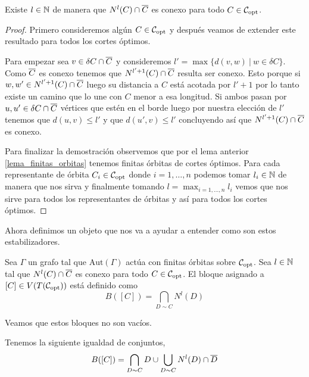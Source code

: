 \documentclass[tesis.tex]{subfiles}
\newcommand{\aut}{\text{Aut}}
\begin{document}
\begin{lema}\label{lema_nlC_cap_olC_conexo}
	Existe $l \in \mathbb{N}$ de manera que $N^l(C) \cap \overline C$ es conexo para todo $C \in {\cal C}_{\text{opt}}$.
\end{lema}
\begin{proof}
	Primero consideremos algún $C \in {\cal C}_{\text{opt}}$ y después veamos de extender este resultado para todos los cortes óptimos.
	
	Para empezar sea $v \in \delta C \cap \overline C$ y consideremos $l' = \max  \{d(v,w) \ | \ w \in \delta C\}$.
	Como $\overline C$ es conexo tenemos que $N^{l'+1}(C) \cap \overline C$ resulta ser conexo.
	Esto porque si $w,w' \in N^{l'+1}(C) \cap \overline C$ luego su distancia a $C$ está acotada por $l'+1$ por lo tanto existe un camino que lo une con $C$ menor a esa longitud.
	Si ambos pasan por $u,u' \in \delta C \cap \overline C$ vértices que estén en el borde luego por nuestra elección de $l'$ tenemos que $d(u,v) \le l'$ y que $d(u',v) \le l'$ concluyendo así que $N^{l'+1}(C) \cap \overline C$ es conexo.
	
	Para finalizar la demostración observemos que por el lema anterior \ref{lema_finitas_orbitas} tenemos finitas órbitas de cortes óptimos.
	Para cada representante de órbita $C_i \in {\cal C}_{\text{opt}}$ donde $i=1,\dots,n$ podemos tomar $l_i \in \mathbb{N}$ de manera que nos sirva y finalmente tomando $l = \max_{i=1,\dots,n} l_i$ vemos que nos sirve para todos los representantes de órbitas y así para todos los cortes óptimos.
\end{proof}

Ahora definimos un objeto que nos va a ayudar a entender como son estos estabilizadores.

\begin{deff}
	Sea $\Gamma$ un grafo tal que $\aut(\Gamma)$ actúa con finitas órbitas sobre ${\cal C}_{\text{opt}}$.
	Sea $l \in \mathbb{N}$ tal que $N^l(C) \cap \overline C$ es conexo para todo $C \in {\cal C}_{\text{opt}}$.
	El bloque asignado a $[C] \in V(T({\cal C}_{\text{opt}}))$ está definido como
	\[
		B([C]) = \bigcap_{D \sim C} N^l (D)
	\]	
\end{deff}

Veamos que estos bloques no son vacíos.

\begin{lema}
	Tenemos la siguiente igualdad de conjuntos,
	\[
		B([C]) = \bigcap_{D \sim C} D \cup \bigcup_{D \sim C} N^l(D) \cap \overline D
	\]
\end{lema}
\end{document}
